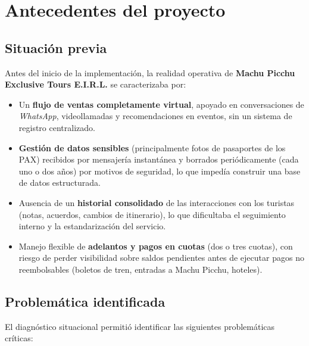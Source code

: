 \section{Antecedentes del proyecto}

\subsection{Situación previa}

Antes del inicio de la implementación, la realidad operativa de \textbf{Machu Picchu Exclusive Tours E.I.R.L.} se caracterizaba por:

\begin{itemize}
    \item Un \textbf{flujo de ventas completamente virtual}, apoyado en conversaciones de \textit{WhatsApp}, videollamadas y recomendaciones en eventos, sin un sistema de registro centralizado.
    \item \textbf{Gestión de datos sensibles} (principalmente fotos de pasaportes de los PAX) recibidos por mensajería instantánea y borrados periódicamente (cada uno o dos años) por motivos de seguridad, lo que impedía construir una base de datos estructurada.
    \item Ausencia de un \textbf{historial consolidado} de las interacciones con los turistas (notas, acuerdos, cambios de itinerario), lo que dificultaba el seguimiento interno y la estandarización del servicio.
    \item Manejo flexible de \textbf{adelantos y pagos en cuotas} (dos o tres cuotas), con riesgo de perder visibilidad sobre saldos pendientes antes de ejecutar pagos no reembolsables (boletos de tren, entradas a Machu Picchu, hoteles).
\end{itemize}

\subsection{Problemática identificada}

El diagnóstico situacional permitió identificar las siguientes problemáticas críticas:

